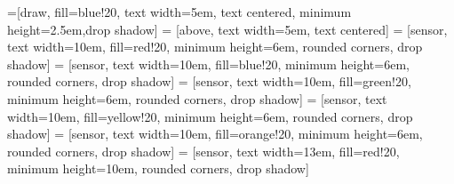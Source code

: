 \documentclass{article}
\begin{document}


=[draw, fill=blue!20, text width=5em, 
    text centered, minimum height=2.5em,drop shadow]
 = [above, text width=5em, text centered]
 = [sensor, text width=10em, fill=red!20, 
    minimum height=6em, rounded corners, drop shadow]
     = [sensor, text width=10em, fill=blue!20, 
    minimum height=6em, rounded corners, drop shadow]
     = [sensor, text width=10em, fill=green!20, 
    minimum height=6em, rounded corners, drop shadow]
     = [sensor, text width=10em, fill=yellow!20, 
    minimum height=6em, rounded corners, drop shadow]
     = [sensor, text width=10em, fill=orange!20, 
    minimum height=6em, rounded corners, drop shadow]
 = [sensor, text width=13em, fill=red!20, 
    minimum height=10em, rounded corners, drop shadow]

\def\blockdist{2.3}
\def\edgedist{2.5}

\end{document}
